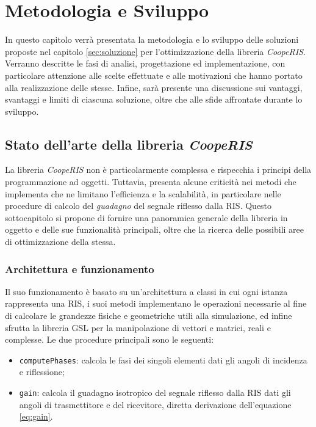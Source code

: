 \chapter{Metodologia e Sviluppo}
\label{ch:metodologiasviluppo}

In questo capitolo verrà presentata la metodologia e lo sviluppo delle soluzioni
proposte nel capitolo \ref{sec:soluzione} per l'ottimizzazione della libreria
\textit{CoopeRIS}. Verranno descritte le fasi di analisi, progettazione ed implementazione,
con particolare attenzione alle scelte effettuate e alle motivazioni che hanno
portato alla realizzazione delle stesse. Infine, sarà presente una discussione
sui vantaggi, svantaggi e limiti di ciascuna soluzione, oltre che alle sfide
affrontate durante lo sviluppo.

\section{Stato dell'arte della libreria \textit{CoopeRIS}}
\label{sec:libreria}

La libreria \textit{CoopeRIS} non è particolarmente complessa e rispecchia i
principi della programmazione ad oggetti. Tuttavia, presenta alcune criticità
nei metodi che implementa che ne limitano l'efficienza e la scalabilità, in particolare
nelle procedure di calcolo del \textit{guadagno} del segnale riflesso dalla RIS.
Questo sottocapitolo si propone di fornire una panoramica generale della libreria
in oggetto e delle sue funzionalità principali, oltre che la ricerca delle
possibili aree di ottimizzazione della stessa.

\subsection{Architettura e funzionamento}
\label{sec:architettura}

Il suo funzionamento è basato su un'architettura a classi in cui ogni istanza rappresenta
una RIS, i suoi metodi implementano le operazioni necessarie al fine di
calcolare le grandezze fisiche e geometriche utili alla simulazione, ed infine sfrutta
la libreria GSL\cite{gnugsl} per la manipolazione di vettori e matrici, reali e complesse.
Le due procedure principali sono le seguenti:

\begin{itemize}
  \item \texttt{computePhases}: calcola le fasi dei singoli elementi dati gli angoli
    di incidenza e riflessione;

  \item \texttt{gain}: calcola il guadagno isotropico del segnale riflesso dalla
    RIS dati gli angoli di trasmettitore e del ricevitore, diretta derivazione
    dell'equazione \ref{eq:gain}.
\end{itemize}

